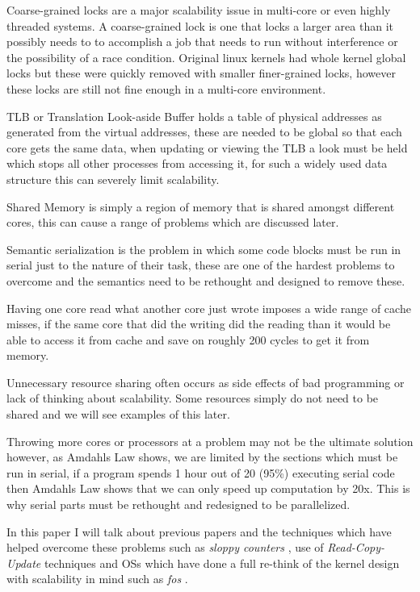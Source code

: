 \documentclass[journal]{IEEEtran}
\begin{document}
\vspace{5mm}

Coarse-grained locks are a major scalability issue in multi-core or even highly threaded systems. A coarse-grained lock is one that locks a larger area than it possibly needs to to accomplish a job that needs to run without interference or the possibility of a race condition. Original linux kernels had whole kernel global locks but these were quickly removed with smaller finer-grained locks, however these locks are still not fine enough in a multi-core environment.

TLB or Translation Look-aside Buffer holds a table of physical addresses as generated from the virtual addresses, these are needed to be global so that each core gets the same data, when updating or viewing the TLB a look must be held which stops all other processes from accessing it, for such a widely used data structure this can severely limit scalability.

Shared Memory is simply a region of memory that is shared amongst different cores, this can cause a range of problems which are discussed later.

Semantic serialization is the problem in which some code blocks must be run in serial just to the nature of their task, these are one of the hardest problems to overcome and the semantics need to be rethought and designed to remove these.

Having one core read what another core just wrote imposes a wide range of cache misses, if the same core that did the writing did the reading than it would be able to access it from cache and save on roughly 200 cycles to get it from memory.

Unnecessary resource sharing often occurs as side effects of bad programming or lack of thinking about scalability. Some resources simply do not need to be shared and we will see examples of this later.

Throwing more cores or processors at a problem may not be the ultimate solution however, as Amdahls Law \cite{Amdahl} shows, we are limited by the sections which must be run in serial, if a program spends 1 hour out of 20 (95\%) executing serial code then Amdahls Law shows that we can only speed up computation by 20x. This is why serial parts must be rethought and redesigned to be parallelized.

In this paper I will talk about previous papers and the techniques which have helped overcome these problems such as \emph{sloppy counters} \cite{sloppy-counters}, use of \emph{Read-Copy-Update} \cite{RCU} techniques and OSs which have done a full re-think of the kernel design with scalability in mind such as \emph{fos} \cite{fos}.
\end{document}
